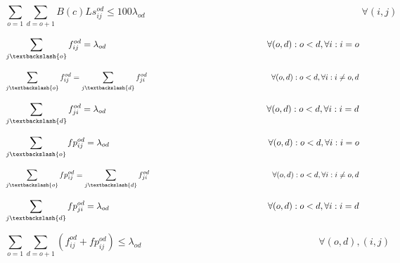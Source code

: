 \begin{equation}
\sum_{o=1} \sum_{d=o+1} B(c) Ls_{ij}^{od} \leq  100 \lambda_{od} \qquad \qquad \qquad \qquad \qquad \qquad \qquad \qquad \qquad \qquad \qquad
\forall (i,j)
\label{ILPTranslucp4}
\end{equation}

\begin{equation}
\sum_{j\textbackslash \{o\}} f_{ij}^{od} = \lambda_{od}  \qquad \qquad \qquad \qquad \qquad \qquad \qquad \qquad \qquad
\forall(o,d) : o < d, \forall i: i = o
\label{ILPTranslucp6}
\end{equation}

\begin{equation}
\sum_{j\textbackslash \{o\}} f_{ij}^{od} = \sum_{j\textbackslash \{d\}} f_{ji}^{od} \qquad \qquad \qquad \qquad \qquad \qquad \qquad \qquad
\forall(o,d) : o < d, \forall i: i \neq o,d
\label{ILPTranslucp7}
\end{equation}

\begin{equation}
\sum_{j\textbackslash \{d\}} f_{ji}^{od} = \lambda_{od}  \qquad \qquad \qquad \qquad \qquad \qquad \qquad \qquad \qquad
\forall(o,d) : o < d, \forall i: i = d
\label{ILPTranslucp8}
\end{equation}

\begin{equation}
\sum_{j\textbackslash \{o\}} fp_{ij}^{od} = \lambda_{od}  \qquad \qquad \qquad \qquad \qquad \qquad \qquad \qquad \qquad
\forall(o,d) : o < d, \forall i: i = o
\label{ILPTranslucp6a}
\end{equation}

\begin{equation}
\sum_{j\textbackslash \{o\}} fp_{ij}^{od} = \sum_{j\textbackslash \{d\}} f_{ji}^{od} \qquad \qquad \qquad \qquad \qquad \qquad \qquad \qquad
\forall(o,d) : o < d, \forall i: i \neq o,d
\label{ILPTranslucp7a}
\end{equation}

\begin{equation}
\sum_{j\textbackslash \{d\}} fp_{ji}^{od} = \lambda_{od}  \qquad \qquad \qquad \qquad \qquad \qquad \qquad \qquad \qquad
\forall(o,d) : o < d, \forall i: i = d
\label{ILPTranslucp8a}
\end{equation}

\begin{equation}
\sum_{o=1} \sum_{d=o+1} \left(f_{ij}^{od}  + fp_{ij}^{od}\right) \leq \lambda_{od}  \qquad \qquad \qquad \qquad \qquad \qquad \qquad \qquad \qquad
\forall (o,d), (i,j)
\label{ILPTranslucpx}
\end{equation}

